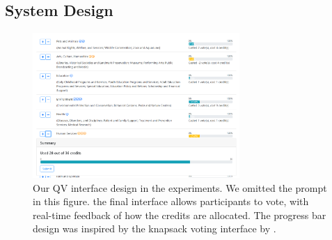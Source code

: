 


\subsection{System Design}

\begin{figure}[htpb]
    \centering
    \includegraphics[width=0.7\textwidth, keepaspectratio=true]{content/image/qv-donation.png}
    \caption{
        Our QV interface design in the experiments. 
        We omitted the prompt in this figure.
        the final interface allows participants to vote, with real-time feedback of how the credits are allocated. 
        The progress bar design was inspired by the knapsack voting interface by \cite{goel2015knapsack}.
    }
    \label{fig:qv_donation}
\end{figure}

